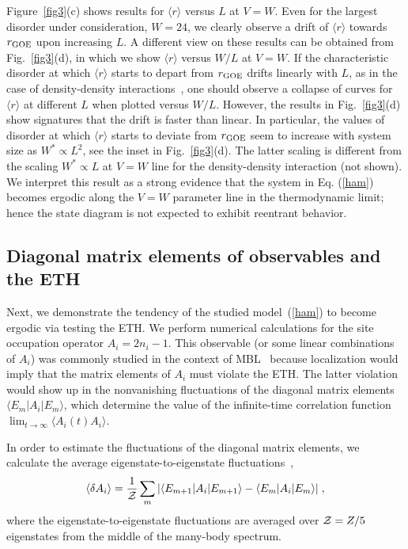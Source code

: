 \documentclass[twocolumn,pre,superscriptaddress,10pt,aps,floatfix]{revtex4-1}
\begin{document}
Figure~\ref{fig3}(c) shows results for $\langle r \rangle$ versus $L$ at $V=W$.
Even for the largest disorder under consideration, $W =24$, we clearly observe a drift of $\langle r  \rangle $ towards $r_{\rm GOE}$ upon increasing $L$.
A different view on these results can be obtained from Fig.~\ref{fig3}(d), in which we show $\langle r \rangle$ versus $W/L$ at $V=W$.
If the characteristic disorder at which $\langle r \rangle$ starts to depart from $r_{\rm GOE}$ drifts linearly with $L$, as in the case of density-density interactions~\cite{suntajs_2020}, one should observe a collapse of curves for $\langle r \rangle$ at different $L$ when plotted versus $W/L$.
However, the results in Fig.~\ref{fig3}(d) show signatures that the drift is faster than linear. In particular, the values of disorder at which
$\langle r  \rangle $ starts to deviate from $r_{\rm GOE}$ seem to increase with system size as $W^* \propto L^2$, see the inset in Fig.~\ref{fig3}(d). 
The latter scaling is different from the scaling $W^*\propto L$ at $V=W$ line for the density-density interaction (not shown).
We interpret this result as a strong evidence that the system in Eq. (\ref{ham})
 becomes ergodic along the $V=W$ parameter line in the thermodynamic limit; hence the state diagram is not expected to exhibit reentrant behavior.

\subsection{Diagonal matrix elements of observables and the ETH} \label{sec:ETH}

Next, we demonstrate the tendency of the studied model~(\ref{ham}) to become ergodic via testing the ETH. We perform numerical calculations for the site occupation operator $A_i=2n_i-1$.  This observable (or some linear combinations of $A_i$) was commonly studied in the context of MBL~\cite{mierzejewski2016,luitz16,sirker14,pal10} because localization would imply that the matrix elements of $A_i$ must violate the ETH. The latter violation would show up in the nonvanishing fluctuations of the diagonal matrix elements $\langle E_m| A_i |E_m \rangle $, which determine the value of the infinite-time correlation function $\lim_{t\to \infty} \langle A_i(t) A_i \rangle$. 

In order to estimate the fluctuations of the diagonal matrix elements, we calculate the average eigenstate-to-eigenstate fluctuations~\cite{Kim_strong2014, Mondaini2016, jansen_stolpp_19},
\begin{equation} \label{eefluct}
\langle \delta A_i \rangle= \frac{1}{\cal{Z}} \sum_{m} |\langle E_{m+1}| A_i |E_{m+1} \rangle -\langle E_m| A_i |E_m \rangle | \;,
\end{equation}
where the eigenstate-to-eigenstate fluctuations are averaged over ${\cal{Z}}=Z/5$ eigenstates from the middle of the many-body spectrum. 
\end{document}
